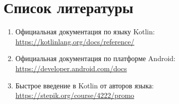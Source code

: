 \documentclass{article}
\begin{document}

%




%
%

\section{Список литературы}

\begin{enumerate}
	\item Официальная документация по языку Kotlin: \url{https://kotlinlang.org/docs/reference/}
	\item Официальная документация по платформе Android: \url{https://developer.android.com/docs}
	\item Быстрое введение в Kotlin от авторов языка: \url{https://stepik.org/course/4222/promo}
\end{enumerate}
\end{document}
